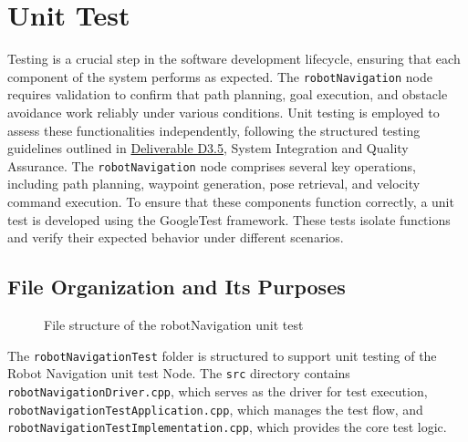 \documentclass{CSSRforAfrica}
\renewcommand{\DTstyle}{\footnotesize\sffamily}
\begin{document}
\newpage
\section{Unit Test}
Testing is a crucial step in the software development lifecycle, ensuring that each component of the system performs as expected. The \verb|robotNavigation| node requires validation to confirm that path planning, goal execution, and obstacle avoidance work reliably under various conditions. Unit testing is employed to assess these functionalities independently, following the structured testing guidelines outlined in \href{https://cssr4africa.github.io/deliverables/CSSR4Africa_Deliverable_D3.5.pdf}{Deliverable D3.5}, System Integration and Quality Assurance.
The \verb|robotNavigation| node comprises several key operations, including path planning, waypoint generation, pose retrieval, and velocity command execution. To ensure that these components function correctly, a unit test is developed using the GoogleTest framework. These tests isolate functions and verify their expected behavior under different scenarios.

\subsection{File Organization and Its Purposes}
\vspace*{0.5em}
\begin{figure}[H]
	\renewcommand*\DTstyle{\ttfamily}
	\caption{File structure of the robotNavigation unit test}
	\label{fig:navigation_test_structure}
\end{figure}

\noindent The \texttt{robotNavigationTest} folder is structured to support unit testing of the Robot Navigation unit test Node. The \texttt{src} directory contains \texttt{robotNavigationDriver.cpp}, which serves as the driver for test execution, \texttt{robotNavigationTestApplication.cpp}, which manages the test flow, and \texttt{robotNavigationTestImplementation.cpp}, which provides the core test logic.\\
\end{document}

